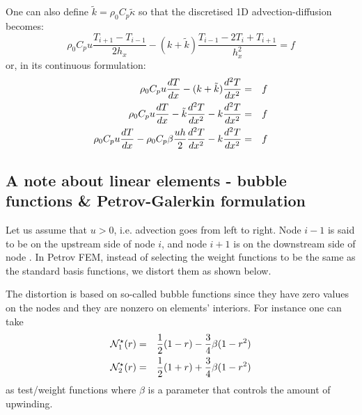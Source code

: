 One can also define $\tilde{k}=\rho_0 C_p \tilde{\kappa}$ so that 
the discretised 1D advection-diffusion becomes:
\begin{equation}
\rho_0 C_p u \frac{T_{i+1}-T_{i-1}}{2h_x}
- (k+ \tilde{k}) \frac{T_{i-1}-2T_i+T_{i+1}}{h_x^2}
= f 
\end{equation}
or, in its continuous formulation:
\begin{eqnarray}
\rho_0 C_p u \frac{dT}{dx} - (k+ \tilde{k}) \frac{d^2T}{dx^2} &=& f \nonumber\\
\rho_0 C_p u \frac{dT}{dx}
- \tilde{k} \frac{d^2T}{dx^2} 
- k \frac{d^2T}{dx^2} &=& f \nonumber\\
\rho_0 C_p u \frac{dT}{dx}
- \rho_0 C_p \beta \frac{u h}{2} \frac{d^2T}{dx^2} 
- k \frac{d^2T}{dx^2} &=& f
\end{eqnarray}





\subsection{A note about linear elements - bubble functions \& Petrov-Galerkin formulation}

Let us assume that $u>0$, i.e. advection goes from left to right. 
Node $i-1$ is said to be on the upstream side of node $i$, and node $i+1$
is on the downstream side of node . In Petrov FEM, instead of selecting the weight functions to be the
same as the standard basis functions, we distort them as shown below.

The distortion is based on so-called bubble functions since they have zero
values on the nodes and they are nonzero on elements' interiors.
For instance one can take
\begin{eqnarray}
{{\mathcal{N}}}^\star_1(r)&=&\frac{1}{2}(1-r)-\frac{3}{4}\beta(1-r^2) \\
{{\mathcal{N}}}^\star_2(r)&=&\frac{1}{2}(1+r)+\frac{3}{4}\beta(1-r^2) 
\end{eqnarray}
as test/weight functions
where $\beta$ is a parameter that controls the amount of upwinding. 

